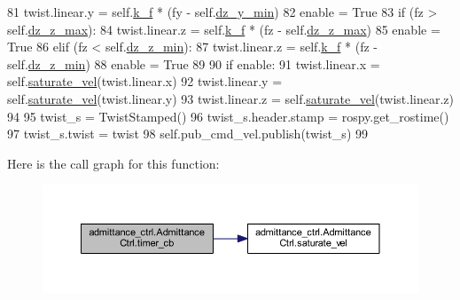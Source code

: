\begin{DoxyCode}
81             twist.linear.y = self.\hyperlink{classadmittance__ctrl_1_1AdmittanceCtrl_a9a0d5d08a89a7cc49b27a9de9d44d8d6}{k\_f} * (fy - self.\hyperlink{classadmittance__ctrl_1_1AdmittanceCtrl_a35e4e59c55a85d6dbc1f5ccfc5b87f25}{dz\_y\_min})
82             enable = \textcolor{keyword}{True}
83         \textcolor{keywordflow}{if}   (fz > self.\hyperlink{classadmittance__ctrl_1_1AdmittanceCtrl_ab3d7954604431dd6244691fd54112420}{dz\_z\_max}):
84             twist.linear.z = self.\hyperlink{classadmittance__ctrl_1_1AdmittanceCtrl_a9a0d5d08a89a7cc49b27a9de9d44d8d6}{k\_f} * (fz - self.\hyperlink{classadmittance__ctrl_1_1AdmittanceCtrl_ab3d7954604431dd6244691fd54112420}{dz\_z\_max})
85             enable = \textcolor{keyword}{True}
86         \textcolor{keywordflow}{elif} (fz < self.\hyperlink{classadmittance__ctrl_1_1AdmittanceCtrl_a6c0fe2e42dde125b1e6f81814ce57c02}{dz\_z\_min}):
87             twist.linear.z = self.\hyperlink{classadmittance__ctrl_1_1AdmittanceCtrl_a9a0d5d08a89a7cc49b27a9de9d44d8d6}{k\_f} * (fz - self.\hyperlink{classadmittance__ctrl_1_1AdmittanceCtrl_a6c0fe2e42dde125b1e6f81814ce57c02}{dz\_z\_min})
88             enable = \textcolor{keyword}{True}
89 
90         \textcolor{keywordflow}{if} enable:
91             twist.linear.x = self.\hyperlink{classadmittance__ctrl_1_1AdmittanceCtrl_a7191d1d7f805fbeef6a0a0667bd0ac65}{saturate\_vel}(twist.linear.x)
92             twist.linear.y = self.\hyperlink{classadmittance__ctrl_1_1AdmittanceCtrl_a7191d1d7f805fbeef6a0a0667bd0ac65}{saturate\_vel}(twist.linear.y)
93             twist.linear.z = self.\hyperlink{classadmittance__ctrl_1_1AdmittanceCtrl_a7191d1d7f805fbeef6a0a0667bd0ac65}{saturate\_vel}(twist.linear.z)
94 
95             twist\_s = TwistStamped()
96             twist\_s.header.stamp = rospy.get\_rostime()
97             twist\_s.twist        = twist
98             self.pub\_cmd\_vel.publish(twist\_s)
99 
\end{DoxyCode}


Here is the call graph for this function\+:
\nopagebreak
\begin{figure}[H]
\begin{center}
\leavevmode
\includegraphics[width=350pt]{dd/d36/classadmittance__ctrl_1_1AdmittanceCtrl_a38c53c8d924147104986363e8bd630f7_cgraph}
\end{center}
\end{figure}


